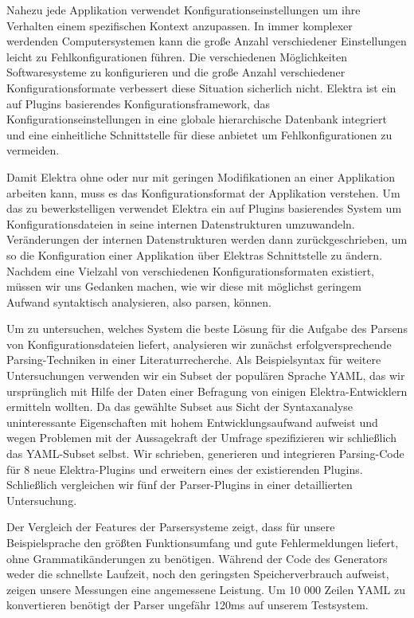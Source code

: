 \begin{kurzfassung}
\begin{sloppypar}
Nahezu jede Applikation verwendet Konfigurationseinstellungen um ihre Verhalten einem spezifischen Kontext anzupassen. In immer komplexer werdenden Computersystemen kann die große Anzahl verschiedener Einstellungen leicht zu Fehlkonfigurationen führen. Die verschiedenen Möglichkeiten Softwaresysteme zu konfigurieren und die große Anzahl verschiedener Konfigurationsformate verbessert diese Situation sicherlich nicht. Elektra ist ein auf Plugins basierendes Konfigurationsframework, das Konfigurationseinstellungen in eine globale hierarchische Datenbank integriert und eine einheitliche Schnittstelle für diese anbietet um Fehlkonfigurationen zu vermeiden.
\end{sloppypar}

Damit Elektra ohne oder nur mit geringen Modifikationen an einer Applikation arbeiten kann, muss es das Konfigurationsformat der Applikation verstehen. Um das zu bewerkstelligen verwendet Elektra ein auf Plugins basierendes System um Konfigurationsdateien in seine internen Datenstrukturen umzuwandeln. Veränderungen der internen Datenstrukturen werden dann zurückgeschrieben, um so die Konfiguration einer Applikation über Elektras Schnittstelle zu ändern. Nachdem eine Vielzahl von verschiedenen Konfigurationsformaten existiert, müssen wir uns Gedanken machen, wie wir diese mit möglichst geringem Aufwand syntaktisch analysieren, also parsen, können.

Um zu untersuchen, welches System die beste Lösung für die Aufgabe des Parsens von Konfigurationsdateien liefert, analysieren wir zunächst erfolgversprechende Parsing-Techniken in einer Literaturrecherche. Als Beispielsyntax für weitere Untersuchungen verwenden wir ein Subset der populären Sprache YAML, das wir ursprünglich mit Hilfe der Daten einer Befragung von einigen Elektra-Entwicklern ermitteln wollten. Da das gewählte Subset aus Sicht der Syntaxanalyse uninteressante Eigenschaften mit hohem Entwicklungsaufwand aufweist und wegen Problemen mit der Aussagekraft der Umfrage spezifizieren wir schließlich das YAML-Subset selbst. Wir schrieben, generieren und integrieren Parsing-Code für 8 neue Elektra-Plugins und erweitern eines der existierenden Plugins. Schließlich vergleichen wir fünf der Parser-Plugins in einer detaillierten Untersuchung.

Der Vergleich der Features der Parsersysteme zeigt, dass für unsere Beispielsprache  den größten Funktionsumfang und gute Fehlermeldungen liefert, ohne Grammatikänderungen zu benötigen. Während der Code des Generators weder die schnellste Laufzeit, noch den geringsten Speicherverbrauch aufweist, zeigen unsere Messungen eine angemessene Leistung. Um 10 000 Zeilen YAML zu konvertieren benötigt der Parser ungefähr 120ms auf unserem Testsystem.
\end{kurzfassung}
